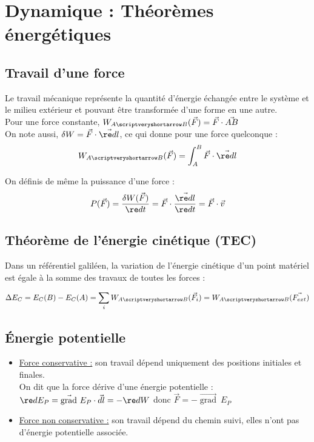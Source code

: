 \documentclass[13pt, twoside, a4paper, french]{report}
\begin{document}
    \chapter{Dynamique : Théorèmes énergétiques}\label{ch:dynamique-theoremes-energetiques}


        \section{Travail d’une force}\label{sec:travail-dune-force}

            Le travail mécanique représente la quantité d’énergie échangée entre le système et le milieu extérieur et pouvant être transformée d’une forme en une autre.\\

            Pour une force constante, $W_{A\scriptveryshortarrow B}(\vec F) = \vec F \cdot \vec{AB}$\\

            On note aussi, $\delta W = \vec F \cdot \vec{\re d l}$, ce qui donne pour une force quelconque :\\
            \[ W_{A\scriptveryshortarrow B}(\vec F) = \int_A^B \vec F \cdot \vec{\re dl} \]

            On définis de même la puissance d'une force :\\
            \[ P(\vec F) = \dfrac{\delta W(\vec F)}{\re d t} = \vec F \cdot \dfrac{\vec{\re d l}}{\re dt} = \vec F \cdot \vec v \]


        \section{Théorème de l'énergie cinétique (TEC)}\label{sec:theoreme-de-l'energie-cinetique-(tec)}

            Dans un référentiel galiléen, la variation de l'énergie cinétique d'un point matériel est égale à la somme des travaux de toutes les forces :

            \[\Delta E_C = E_C(B) - E_C(A) = \sum_i W_{A \scriptveryshortarrow B}(\vec{F_i}) = W_{A \scriptveryshortarrow B}(\vec{F_{ext}})\]


        \section{Énergie potentielle}\label{sec:energie-potentielle}


            \begin{itemize}
                \item \underline{Force conservative :} son travail dépend uniquement des positions initiales et finales.\\
                On dit que la force dérive d'une énergie potentielle : $\re d E_P = \vec{\operatorname{grad}}\ E_P \cdot \vec{d l} = -\re d W$ donc $\vec F = - \vec{\operatorname{grad}}\ E_P$\\
                \item \underline{Force non conservative :} son travail dépend du chemin suivi, elles n'ont pas d'énergie potentielle associée.
            \end{itemize}
\end{document}
